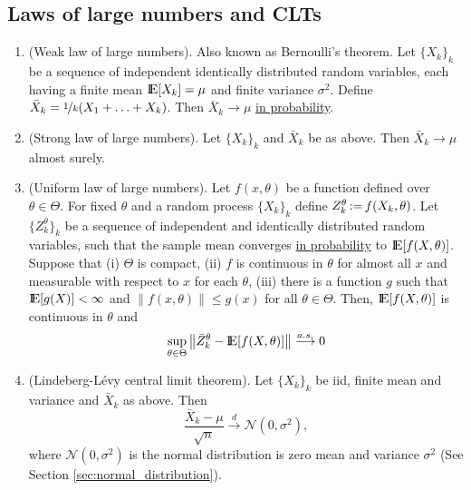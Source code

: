 \documentclass[a4paper,10pt]{scrbook}
\begin{document}
\subsection{Laws of large numbers and CLTs} 
\begin{enumerate}
  \item (Weak law of large numbers). Also known as Bernoulli's theorem. Let $\{X_k\}_k$ be
       a sequence of independent identically distributed random variables, each having a 
       finite mean $\E[X_k]=\mu$ and finite variance $\sigma^2$. Define 
       $\bar{X}_k=\nicefrac{1}{k}(X_1+\ldots+X_k)$. Then $\bar{X}_k\to \mu$ 
       \hyperlink{link:convergence_in_probability}{in probability}.
   \item (\hypertarget{link:sLLN}{Strong law of large numbers}). Let $\{X_k\}_k$ and $\bar{X}_k$ be as above.
         Then $\bar{X}_k\to \mu$ almost surely.    
   \item (Uniform law of large numbers).  Let $f(x,\theta)$ be a function defined over
         $\theta\in\Theta$. For fixed $\theta$ and 
         a random process $\{X_k\}_k$ define $Z_k^\theta {}\mathop{\mathrel{:}=}{} f(X_k, \theta)$. Let 
         $\{Z_k^\theta\}_k$ be a sequence of independent and identically distributed 
         random variables, such that the sample mean converges 
         \hyperlink{link:convergence_in_probability}{in probability} to $\E[f(X, \theta)]$. 
         Suppose that (i) $\Theta$ is compact, (ii) $f$ is continuous 
         in $\theta$ for almost all $x$ and measurable with respect to $x$ for each $\theta$,
         (iii) there is a function $g$ such that $\E[g(X)]<\infty$ and $\|f(x,\theta)\| \leq g(x)$ 
         for all $\theta\in\Theta$. Then, $\E[f(X,\theta)]$ is continuous in $\theta$ and
         \[
          \sup_{\theta\in\Theta}\left\| 
	    \bar{Z}^\theta_k - \E[f(X,\theta)] 
          \right\|
          \overset{a.s.}{\longrightarrow} 0
         \]

   \item (Lindeberg-L{\'e}vy central limit theorem). Let $\{X_k\}_k$ be iid, finite mean and variance 
         and $\bar{X}_k$ as above. Then
         \[
          \frac{\bar{X}_k-\mu}{\sqrt{n}} \overset{d}{\longrightarrow} \mathcal{N}(0, \sigma^2),
         \]
         where \(\mathcal{N}(0, \sigma^2)\) is the normal distribution is zero mean and variance \(\sigma^2\)
         (See Section \ref{sec:normal_distribution}).


\end{enumerate}
\end{document}
